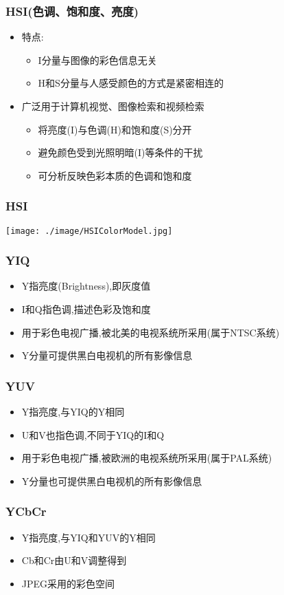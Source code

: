 \documentclass{beamer}
\begin{document}
\begin{frame}
\frametitle{HSI(色调、饱和度、亮度)}
\label{sec-2-5}

\begin{itemize}
\item 特点:
\begin{itemize}
\item I分量与图像的彩色信息无关
\item H和S分量与人感受颜色的方式是紧密相连的
\end{itemize}
\item 广泛用于计算机视觉、图像检索和视频检索
\begin{itemize}
\item 将亮度(I)与色调(H)和饱和度(S)分开
\item 避免颜色受到光照明暗(I)等条件的干扰
\item 可分析反映色彩本质的色调和饱和度
\end{itemize}
\end{itemize}
\end{frame}
\begin{frame}
\frametitle{HSI}
\label{sec-2-6}

\centering
\texttt{[image: ./image/HSIColorModel.jpg]}
\end{frame}
\begin{frame}
\frametitle{YIQ}
\label{sec-2-7}

\begin{itemize}
\item Y指亮度(Brightness),即灰度值
\item I和Q指色调,描述色彩及饱和度
\item 用于彩色电视广播,被北美的电视系统所采用(属于NTSC系统)
\item Y分量可提供黑白电视机的所有影像信息
\end{itemize}
\end{frame}
\begin{frame}
\frametitle{YUV}
\label{sec-2-8}

\begin{itemize}
\item Y指亮度,与YIQ的Y相同
\item U和V也指色调,不同于YIQ的I和Q
\item 用于彩色电视广播,被欧洲的电视系统所采用(属于PAL系统)
\item Y分量也可提供黑白电视机的所有影像信息
\end{itemize}
\end{frame}
\begin{frame}
\frametitle{YCbCr}
\label{sec-2-9}

\begin{itemize}
\item Y指亮度,与YIQ和YUV的Y相同
\item Cb和Cr由U和V调整得到
\item JPEG采用的彩色空间
\end{itemize}
\end{frame}
\end{document}
